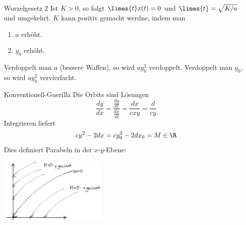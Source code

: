 \begin{karte}{Wurzelgesetz 2}
    Ist \(K>0\), so folgt \(\limes{t} x(t) = 0\) und \( \limes{t} = \sqrt{K/a}\) 
    und umgekehrt. \(K\) kann positiv gemacht werdne, indem man 
    \begin{enumerate}
        \item \(a\) erhöht.
        \item \(y_0\) erhöht.
    \end{enumerate}
    Verdoppelt man \(a\) (bessere Waffen), so wird \(ay_0^2\) verdoppelt. 
    Verdoppelt man \(y_0\), so wird \(ay_0^2\) vervierfacht.
\end{karte}

\begin{karte}{Konventionell-Guerilla}
    Die Orbits sind Lösungen 
    \[ \frac{dy}{dx} = \frac{\frac{dy}{dt}}{\frac{dx}{dt}} = \frac{dx}{cxy} 
    = \frac{d}{cy} \]
    Integrieren liefert 
    \[ cy^2 - 2dx = cy_0^2 - 2dx_0 = M\in \R \]
    Dies definiert Parabeln in der \(x\)-\(y\)-Ebene: 
    \begin{center}
        \includegraphics[width=0.4\textwidth]{img/parabeln-guerilla.png}
    \end{center}
\end{karte}
